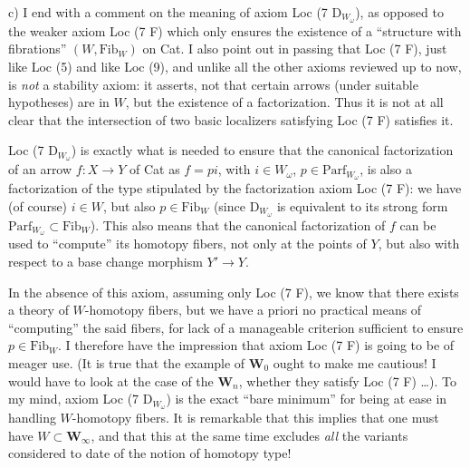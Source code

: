\documentclass[11pt]{article}
\newcommand{\printedpage}[1]{\marginpar{\footnotesize p.~#1}}
\newcommand{\msp}[1]{\marginpar{\footnotesize [#1]}}
\begin{document}
c) I end with a comment on the meaning of axiom Loc (7 D$_{W_\omega}$), as opposed to the weaker axiom Loc (7 F) which only ensures the existence of a ``structure with fibrations'' $(W, \mathrm{Fib}_W)$ on Cat. I also point out in passing that Loc (7 F), just like Loc (5) and like Loc (9), and unlike all the other axioms reviewed up to now, is \textit{not} a stability axiom: it asserts, not that certain arrows (under suitable hypotheses) are in $W$, but the existence of a factorization. Thus it is
\msp{page 90}
not at all clear that the intersection of two basic localizers satisfying Loc (7 F) satisfies it.

Loc (7 D$_{W_\omega}$) is exactly what is needed to ensure that the canonical factorization of an arrow $f : X \longrightarrow Y$ of Cat as $f = pi$, with $i \in W_\omega$, $p \in \mathrm{Parf}_{W_\omega}$, is also a factorization of the type stipulated by the factorization axiom Loc (7 F): we have (of course) $i \in W$, but also $p \in \mathrm{Fib}_W$ (since D$_{W_\omega}$ is equivalent to its strong form $\mathrm{Parf}_{W_\omega} \subset \mathrm{Fib}_W$). This also means that the canonical factorization of $f$ can be used to ``compute'' its homotopy fibers, not only at the points of $Y$, but also with respect to a base change morphism $Y' \longrightarrow Y$.

In the absence of this axiom,
\msp{page 91}
\printedpage{47}
assuming only Loc (7 F), we know that there exists a theory of $W$-homotopy fibers, but we have a priori no practical means of ``computing'' the said fibers, for lack of a manageable criterion sufficient to ensure $p \in \mathrm{Fib}_W$. I therefore have the impression that axiom Loc (7 F) is going to be of meager use. (It is true that the example of $\mathbf{W}_0$ ought to make me cautious! I would have to look at the case of the $\mathbf{W}_n$, whether they satisfy Loc (7 F) \ldots). To my mind, axiom Loc (7 D$_{W_\omega}$) is the exact ``bare minimum'' for being at ease in handling $W$-homotopy fibers. It is remarkable that this implies that one must have $W \subset \mathbf{W}_\infty$, and that this at the same time excludes \textit{all} the variants considered to date of the notion of homotopy type!
\end{document}
